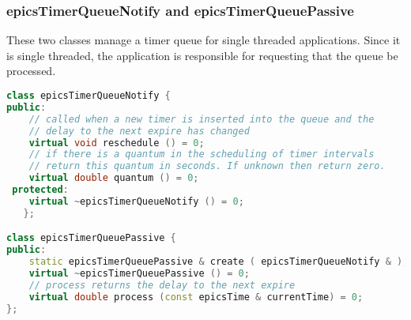 \subsubsection{epicsTimerQueueNotify and epicsTimerQueuePassive}

These two classes manage a timer queue for single threaded applications. Since it is single threaded, the application is 
responsible for requesting that the queue be processed.

\begin{lstlisting}[language=C++]
class epicsTimerQueueNotify {
public:
    // called when a new timer is inserted into the queue and the
    // delay to the next expire has changed
    virtual void reschedule () = 0;
    // if there is a quantum in the scheduling of timer intervals
    // return this quantum in seconds. If unknown then return zero.
    virtual double quantum () = 0;
 protected:
    virtual ~epicsTimerQueueNotify () = 0;
   };

class epicsTimerQueuePassive {
public:
    static epicsTimerQueuePassive & create ( epicsTimerQueueNotify & );
    virtual ~epicsTimerQueuePassive () = 0;
    // process returns the delay to the next expire
    virtual double process (const epicsTime & currentTime) = 0;
};
\end{lstlisting}

